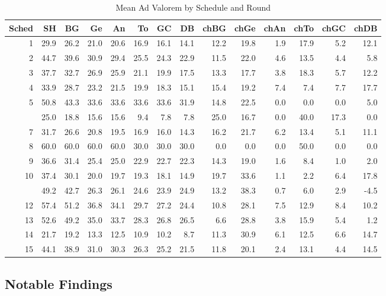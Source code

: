 \documentclass[
  12pt,
]{article}
\begin{document}
\begin{table}[!h]

\caption{\label{tab:av-sc-rd}Mean Ad Valorem by Schedule and Round}
\centering
\begin{tabular}[t]{rrrrrrrrrrrrrr}
\toprule
Sched & SH & BG & Ge & An & To & GC & DB & chBG & chGe & chAn & chTo & chGC & chDB\\
\midrule
1 & 29.9 & 26.2 & 21.0 & 20.6 & 16.9 & 16.1 & 14.1 & 12.2 & 19.8 & 1.9 & 17.9 & 5.2 & 12.1\\
2 & 44.7 & 39.6 & 30.9 & 29.4 & 25.5 & 24.3 & 22.9 & 11.5 & 22.0 & 4.6 & 13.5 & 4.4 & 5.8\\
3 & 37.7 & 32.7 & 26.9 & 25.9 & 21.1 & 19.9 & 17.5 & 13.3 & 17.7 & 3.8 & 18.3 & 5.7 & 12.2\\
4 & 33.9 & 28.7 & 23.2 & 21.5 & 19.9 & 18.3 & 15.1 & 15.4 & 19.2 & 7.4 & 7.4 & 7.7 & 17.7\\
5 & 50.8 & 43.3 & 33.6 & 33.6 & 33.6 & 33.6 & 31.9 & 14.8 & 22.5 & 0.0 & 0.0 & 0.0 & 5.0\\
\addlinespace
6 & 25.0 & 18.8 & 15.6 & 15.6 & 9.4 & 7.8 & 7.8 & 25.0 & 16.7 & 0.0 & 40.0 & 17.3 & 0.0\\
7 & 31.7 & 26.6 & 20.8 & 19.5 & 16.9 & 16.0 & 14.3 & 16.2 & 21.7 & 6.2 & 13.4 & 5.1 & 11.1\\
8 & 60.0 & 60.0 & 60.0 & 60.0 & 30.0 & 30.0 & 30.0 & 0.0 & 0.0 & 0.0 & 50.0 & 0.0 & 0.0\\
9 & 36.6 & 31.4 & 25.4 & 25.0 & 22.9 & 22.7 & 22.3 & 14.3 & 19.0 & 1.6 & 8.4 & 1.0 & 2.0\\
10 & 37.4 & 30.1 & 20.0 & 19.7 & 19.3 & 18.1 & 14.9 & 19.7 & 33.6 & 1.1 & 2.2 & 6.4 & 17.8\\
\addlinespace
11 & 49.2 & 42.7 & 26.3 & 26.1 & 24.6 & 23.9 & 24.9 & 13.2 & 38.3 & 0.7 & 6.0 & 2.9 & -4.5\\
12 & 57.4 & 51.2 & 36.8 & 34.1 & 29.7 & 27.2 & 24.4 & 10.8 & 28.1 & 7.5 & 12.9 & 8.4 & 10.2\\
13 & 52.6 & 49.2 & 35.0 & 33.7 & 28.3 & 26.8 & 26.5 & 6.6 & 28.8 & 3.8 & 15.9 & 5.4 & 1.2\\
14 & 21.7 & 19.2 & 13.3 & 12.5 & 10.9 & 10.2 & 8.7 & 11.3 & 30.9 & 6.1 & 12.5 & 6.6 & 14.7\\
15 & 44.1 & 38.9 & 31.0 & 30.3 & 26.3 & 25.2 & 21.5 & 11.8 & 20.1 & 2.4 & 13.1 & 4.4 & 14.5\\
\bottomrule
\end{tabular}
\end{table}

\hypertarget{notable-findings}{%
\subsection{Notable Findings}\label{notable-findings}}
\end{document}
